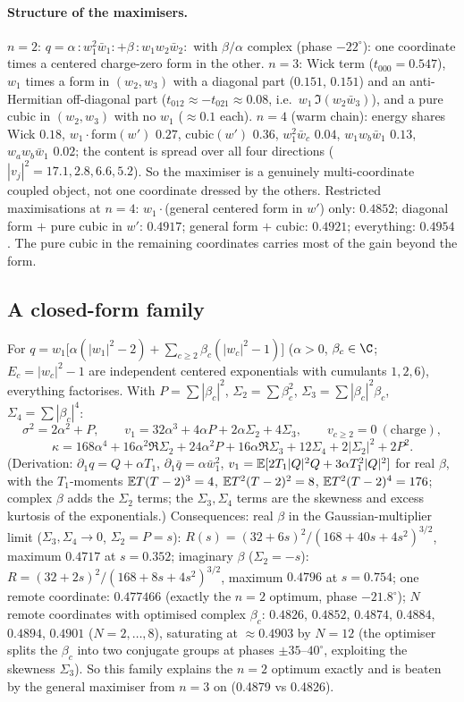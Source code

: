 \paragraph{Structure of the maximisers.} $n=2$: $q=\alpha\,{:}w_1^2\bar w_1{:}+\beta\,{:}w_1w_2\bar w_2{:}$ with $\beta/\alpha$ complex (phase $-22^\circ$): one coordinate times a
centered charge-zero form in the other. $n=3$: Wick term ($t_{000}=0.547$), $w_1$ times a form in $(w_2,w_3)$ with a diagonal part ($0.151$, $0.151$) and an anti-Hermitian
off-diagonal part ($t_{012}\approx-t_{021}\approx0.08$, i.e.\ $w_1\,\Im(w_2\bar w_3)$), and a pure cubic in $(w_2,w_3)$ with no $w_1$ ($\approx0.1$ each). $n=4$ (warm chain): energy shares
Wick $0.18$, $w_1\cdot$form$(w')$ $0.27$, cubic$(w')$ $0.36$, $w_1^2\bar w_c$ $0.04$, $w_1w_b\bar w_1$ $0.13$, $w_aw_b\bar w_1$ $0.02$; the content is spread over all four directions
($|v_j|^2=17.1,2.8,6.6,5.2$). So the maximiser is a genuinely multi-coordinate coupled object, not one coordinate dressed by the others. Restricted maximisations at $n=4$:
$w_1\cdot$(general centered form in $w'$) only: $0.4852$; diagonal form $+$ pure cubic in $w'$: $0.4917$; general form $+$ cubic: $0.4921$; everything: $0.4954$. The pure cubic in the
remaining coordinates carries most of the gain beyond the form.

\subsection{A closed-form family}
For $q=w_1\bigl[\alpha(|w_1|^2-2)+\sum_{c\ge2}\beta_c(|w_c|^2-1)\bigr]$ ($\alpha>0$, $\beta_c\in\C$; $E_c=|w_c|^2-1$ are independent centered exponentials with cumulants $1,2,6$),
everything factorises. With $P=\sum|\beta_c|^2$, $\Sigma_2=\sum\beta_c^2$, $\Sigma_3=\sum|\beta_c|^2\beta_c$, $\Sigma_4=\sum|\beta_c|^4$:
\[
\sigma^2=2\alpha^2+P,\qquad v_1=32\alpha^3+4\alpha P+2\alpha\Sigma_2+4\Sigma_3,\qquad v_{c\ge2}=0\ (\text{charge}),
\]
\[
\kappa=168\alpha^4+16\alpha^2\Re\Sigma_2+24\alpha^2P+16\alpha\Re\Sigma_3+12\Sigma_4+2|\Sigma_2|^2+2P^2 .
\]
(Derivation: $\partial_1q=Q+\alpha T_1$, $\partial_1\bar q=\alpha\bar w_1^2$, $v_1=\mathbb E[2T_1|Q|^2Q+3\alpha T_1^2|Q|^2]$ for real $\beta$, with the $T_1$-moments $\mathbb E T(T-2)^3=4$,
$\mathbb E T^2(T-2)^2=8$, $\mathbb E T^2(T-2)^4=176$; complex $\beta$ adds the $\Sigma_2$ terms; the $\Sigma_3,\Sigma_4$ terms are the skewness and excess kurtosis of the exponentials.)
Consequences: real $\beta$ in the Gaussian-multiplier limit ($\Sigma_3,\Sigma_4\to0$, $\Sigma_2=P=s$): $R(s)=(32+6s)^2/(168+40s+4s^2)^{3/2}$, maximum $0.4717$ at $s=0.352$;
imaginary $\beta$ ($\Sigma_2=-s$): $R=(32+2s)^2/(168+8s+4s^2)^{3/2}$, maximum $0.4796$ at $s=0.754$; one remote coordinate: $0.477466$ (exactly the $n=2$ optimum, phase $-21.8^\circ$);
$N$ remote coordinates with optimised complex $\beta_c$: $0.4826$, $0.4852$, $0.4874$, $0.4884$, $0.4894$, $0.4901$ ($N=2,\ldots,8$), saturating at $\approx0.4903$ by $N=12$ (the
optimiser splits the $\beta_c$ into two conjugate groups at phases $\pm35$--$40^\circ$, exploiting the skewness $\Sigma_3$). So this family explains the $n=2$ optimum exactly and
is beaten by the general maximiser from $n=3$ on (0.4879 vs 0.4826).


